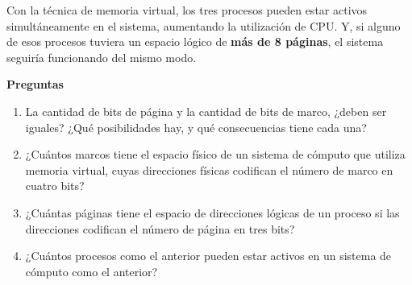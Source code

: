 \documentclass[spanish,A4,]{article}
\begin{document}
Con la técnica de memoria virtual, los tres procesos pueden estar
activos simultáneamente en el sistema, aumentando la utilización de CPU.
Y, si alguno de esos procesos tuviera un espacio lógico de \textbf{más
de 8 páginas}, el sistema seguiría funcionando del mismo modo.

\textbf{Preguntas}

\begin{enumerate}
\def\labelenumi{\arabic{enumi}.}
\itemsep1pt\parskip0pt
\item
  La cantidad de bits de página y la cantidad de bits de marco, ¿deben
  ser iguales? ¿Qué posibilidades hay, y qué consecuencias tiene cada
  una?
\item
  ¿Cuántos marcos tiene el espacio físico de un sistema de cómputo que
  utiliza memoria virtual, cuyas direcciones físicas codifican el número
  de marco en cuatro bits?
\item
  ¿Cuántas páginas tiene el espacio de direcciones lógicas de un proceso
  si las direcciones codifican el número de página en tres bits?
\item
  ¿Cuántos procesos como el anterior pueden estar activos en un sistema
  de cómputo como el anterior?
\end{enumerate}
\end{document}

